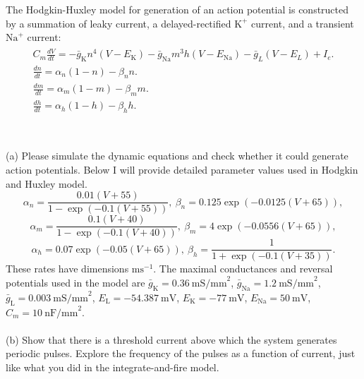 \documentclass{article}
\begin{document}
The Hodgkin-Huxley model for generation of an action potential is constructed by a summation of leaky current, a delayed-rectified $\textrm{K}^{+}$ current, and a transient $\textrm{Na}^{+}$ current:
\begin{eqnarray}
\begin{aligned}
C_{m}\frac{dV}{dt}=-\bar{g}_{\textrm{K}}n^{4}(V-E_{\textrm{K}})-\bar{g}_{\textrm{Na}}m^{3}h(V-E_{\textrm{Na}})-\bar{g}_L(V-E_L)+I_{e}.  \\  
\frac{dn}{dt}=\alpha_n (1-n) - \beta_n n. \\
\frac{dm}{dt}=\alpha_m(1-m) - \beta_m m. \\
\frac{dh}{dt}=\alpha_h(1-h) - \beta_h h. \\
\end{aligned}
\end{eqnarray}
\\
\\
(a) Please simulate the dynamic equations and check whether it could generate action potentials. Below I will provide detailed parameter values used in Hodgkin and Huxley model. 
\[\alpha_n=\frac{0.01(V+55)}{1-\exp(-0.1(V+55))}, \ \beta_n=0.125\exp(-0.0125(V+65)),\]
\[\alpha_m=\frac{0.1(V+40)}{1-\exp(-0.1(V+40))},\ \beta_m=4\exp(-0.0556(V+65)),\]
\[\alpha_h=0.07\exp(-0.05(V+65)), \ \beta_h=\frac{1}{1+\exp(-0.1(V+35))}. \]
These rates have dimensions $\textrm{ms}^{-1}$. The maximal conductances and reversal potentials used in the model are $\bar{g}_{\textrm{K}} = 0.36\  \textrm{mS/mm}^2$, $\bar{g}_{\textrm{Na}} = 1.2\  \textrm{mS/mm}^2$,   $\bar{g}_{\textrm{L}} = 0.003\  \textrm{mS/mm}^2$, $E_\textrm{L} = -54.387\  \textrm{mV}$, $E_\textrm{K} = -77\  \textrm{mV}$, $E_\textrm{Na} = 50\  \textrm{mV}$, $C_m = 10\ \textrm{nF/mm}^2$.
\\
\\
(b) Show that there is a threshold current above which the system generates periodic pulses. Explore the frequency of the pulses as a function of current, just like what you did in the integrate-and-fire model.
\end{document}
